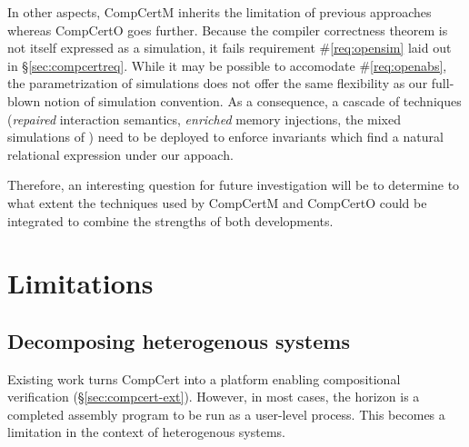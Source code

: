 \documentclass[draft,11pt]{report}
\theoremstyle{definition}
\begin{document}
In other aspects,
CompCertM inherits the limitation of previous approaches
whereas CompCertO goes further.
Because the compiler correctness theorem
is not itself expressed as a simulation,
it fails requirement \#\ref{req:opensim}
laid out in \S\ref{sec:compcertreq}.
While it may be possible to accomodate \#\ref{req:openabs},
the parametrization of simulations
does not offer the same flexibility as
our full-blown notion of simulation convention.
As a consequence, a cascade of techniques
(\emph{repaired} interaction semantics,
\emph{enriched} memory injections,
the mixed simulations of \citep{pilsner})
need to be deployed to enforce invariants
which find a natural relational expression
under our appoach.

Therefore,
an interesting question for future investigation
will be to determine to what extent
the techniques used by CompCertM and CompCertO
could be integrated to combine
the strengths of both developments.



\section{Limitations} %

\subsection{Decomposing heterogenous systems} %

Existing work turns CompCert
into a platform enabling compositional verification
(\S\ref{sec:compcert-ext}).
However, in most cases,
the horizon is a completed assembly program to be run as a user-level process.
This becomes a limitation in the context of heterogenous systems.
\end{document}
